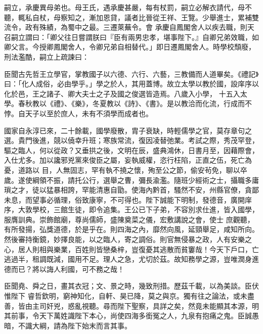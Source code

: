 \begin{pinyinscope}
 嗣立，承慶異母弟也。母王氏，遇承慶甚嚴，每有杖罰，嗣立必解衣請代，母不聽，輒私自杖，母察知之，漸加恩貸，議者比晉從王祥、王覽。少舉進士，累補雙流令，政有殊績，為蜀中之最。三遷萊蕪令。會
 承慶自鳳閣舍人以疾去職，則天召嗣立謂曰：「卿父往日嘗謂朕曰『臣有兩男忠孝，堪事陛下。』自卿兄弟效職，如卿父言。今授卿鳳閣舍人，令卿兄弟自相替代。」即日遷鳳閣舍人。時學校頹廢，刑法濫酷，嗣立上疏諫曰：



 臣聞古先哲王立學官，掌教國子以六德、六行、六藝，三教備而人道畢矣。《禮記》曰：「化人成俗，必由學乎。」學之於人，其用蓋博。故立太學以教於國，設庠序以化於邑，王之諸子、卿大夫士之子及國之俊選皆造焉。八歲入小學，
 十五入太學。春秋教以《禮》、《樂》，冬夏教以《詩》、《書》。是以教洽而化流，行成而不悖。自天子以至於庶人，未有不須學而成者也。



 國家自永淳已來，二十餘載，國學廢散，胄子衰缺，時輕儒學之官，莫存章句之選。貴門後進，競以僥幸升班；寒族常流，復因凌替弛業。考試之際，秀茂罕登，驅之臨人，何以從政？又垂拱之後，文明在辰，盛典鴻休，日書月至，因藉際會，入仕尤多。加以讒邪兇黨來俊臣之屬，妄執威權，恣行枉陷，正直之伍，死亡為憂，道路以
 目，人無固志，罕有執不撓之懷，殉至公之節，偷安茍免，聊以卒歲。遂使綱領不振，請托公行，選舉之曹，彌長渝濫。隨班少經術之士，攝職多庸瑣之才，徒以猛暴相誇，罕能清惠自勖。使海內黔首，騷然不安，州縣官僚，貪鄙未息，而望事必循理，俗致康寧，不可得也。陛下誠能下明制，發德音，廣開庠序，大敦學校，三館生徒，即令追集。王公已下子弟，不容別求仕進，皆入國學，服膺訓典。崇飾館廟，尊尚儒師，盛陳奠菜之儀，宏敷講說之會，使士
 庶觀聽，有所發揚，弘獎道德，於是乎在。則四海之內，靡然向風，延頸舉足，咸知所向。然後審持衡鏡，妙擇良能，以之臨人，寄之調俗。則官無侵暴之政，人有安樂之心，居人則相與樂業，百姓則皆戀桑梓，豈復憂其逃散而貧窶哉！今天下戶口，亡逃過半，租調既減，國用不足。理人之急，尤切於茲。故知務學之源，豈唯潤身進德而已？將以誨人利國，可不務之哉！



 臣聞堯、舜之日，畫其衣冠；文、景之時，幾致刑措。歷茲千載，以為美談。臣伏惟陛下
 睿哲欽明，窮神知化，自軒、昊已降，莫之與京。獨有往之論法，或未盡善，皆由主司奸兇，惑亂視聽。尋而陛下聖察，具詳之矣，然竟未能顯其本源，明其前事，令天下萬姓識陛下本心，尚使四海多銜冤之人，九泉有抱痛之鬼。臣誠愚暗，不識大綱，請為陛下始末而言其事。




\end{pinyinscope}

